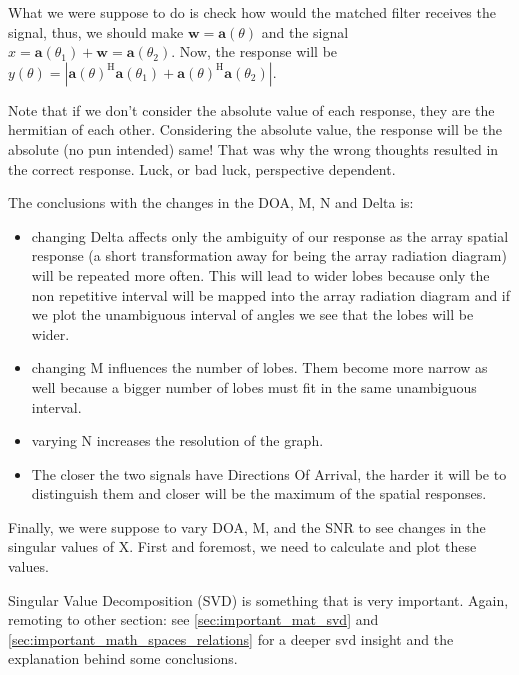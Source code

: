 \documentclass[12pt, a4paper]{article}
\begin{document}
What we were suppose to do is check how would the matched filter receives the signal, thus, we should make $\mathbf{w} = \mathbf{a}(\theta)$ and the signal $x = \mathbf{a}(\theta_1) + \mathbf{w} = \mathbf{a}(\theta_2)$. Now, the response will be $y(\theta) = |\mathbf{a}(\theta)^\text{H} \mathbf{a}(\theta_1) + \mathbf{a}(\theta)^\text{H} \mathbf{a}(\theta_2)|$. 

Note that if we don't consider the absolute value of each response, they are the hermitian of each other. Considering the absolute value, the response will be the absolute (no pun intended) same! That was why the wrong thoughts resulted in the correct response. Luck, or bad luck, perspective dependent.

\vspace{.8cm}



\par The conclusions with the changes in the DOA, M, N and Delta is:
\begin{itemize}
    \item changing Delta affects only the ambiguity of our response as the array spatial response (a short transformation away for being the array radiation diagram) will be repeated more often. This will lead to wider lobes because only the non repetitive interval will be mapped into the array radiation diagram and if we plot the unambiguous interval of angles we see that the lobes will be wider.
    \item changing M influences the number of lobes. Them become more narrow as well because a bigger number of lobes must fit in the same unambiguous interval.
    \item varying N increases the resolution of the graph.
    \item The closer the two signals have Directions Of Arrival, the harder it will be to distinguish them and closer will be the maximum of the spatial responses. 
\end{itemize}

\par Finally, we were suppose to vary DOA, M, and the SNR to see changes in the singular values of X. First and foremost, we need to calculate and plot these values.

\par Singular Value Decomposition (SVD) is something that is very important. Again, remoting to other section: see  \ref{sec:important_mat_svd} and \ref{sec:important_math_spaces_relations} for a deeper svd insight and the explanation behind some conclusions.
\end{document}

